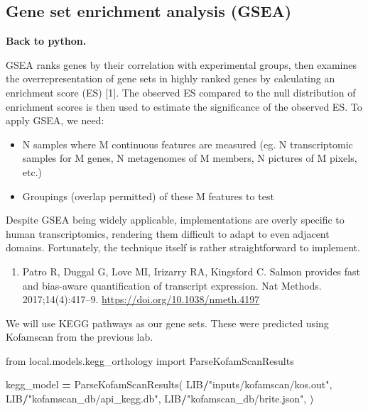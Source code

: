 \documentclass[
]{book}
\newenvironment{Shaded}{\begin{snugshade}}{\end{snugshade}}
\newcommand{\ImportTok}[1]{#1}
\newcommand{\NormalTok}[1]{#1}
\newcommand{\OperatorTok}[1]{\textcolor[rgb]{0.81,0.36,0.00}{\textbf{#1}}}
\newcommand{\StringTok}[1]{\textcolor[rgb]{0.31,0.60,0.02}{#1}}
\providecommand{\tightlist}{%
  \setlength{\itemsep}{0pt}\setlength{\parskip}{0pt}}
\begin{document}
\subsection{Gene set enrichment analysis (GSEA)}\label{gene-set-enrichment-analysis-gsea}

\textbf{Back to python.}

GSEA ranks genes by their correlation with experimental groups, then examines the overrepresentation of gene sets in highly ranked genes by calculating an
enrichment score (ES) {[}1{]}. The observed ES compared to the null distribution of enrichment scores is then used to estimate the significance of the observed ES.
To apply GSEA, we need:

\begin{itemize}
\tightlist
\item
  N samples where M continuous features are measured (eg. N transcriptomic samples for M genes, N metagenomes of M members, N pictures of M pixels, etc.)
\item
  Groupings (overlap permitted) of these M features to test
\end{itemize}

Despite GSEA being widely applicable, implementations are overly specific to human transcriptomics, rendering them difficult to adapt to even adjacent domains.
Fortunately, the technique itself is rather straightforward to implement.

\begin{enumerate}
\def\labelenumi{\arabic{enumi}.}
\tightlist
\item
  Patro R, Duggal G, Love MI, Irizarry RA, Kingsford C. Salmon provides fast and bias-aware quantification of transcript expression. Nat Methods. 2017;14(4):417--9. \url{https://doi.org/10.1038/nmeth.4197}
\end{enumerate}

We will use KEGG pathways as our gene sets. These were predicted using Kofamscan from the previous lab.

\begin{Shaded}
\begin{Highlighting}[numbers=left,,]
\ImportTok{from}\NormalTok{ local.models.kegg\_orthology }\ImportTok{import}\NormalTok{ ParseKofamScanResults}

\NormalTok{kegg\_model }\OperatorTok{=}\NormalTok{ ParseKofamScanResults(}
\NormalTok{    LIB}\OperatorTok{/}\StringTok{"inputs/kofamscan/kos.out"}\NormalTok{,}
\NormalTok{    LIB}\OperatorTok{/}\StringTok{"kofamscan\_db/api\_kegg.db"}\NormalTok{,}
\NormalTok{    LIB}\OperatorTok{/}\StringTok{"kofamscan\_db/brite.json"}\NormalTok{,}
\NormalTok{)}
\end{Highlighting}
\end{Shaded}
\end{document}
